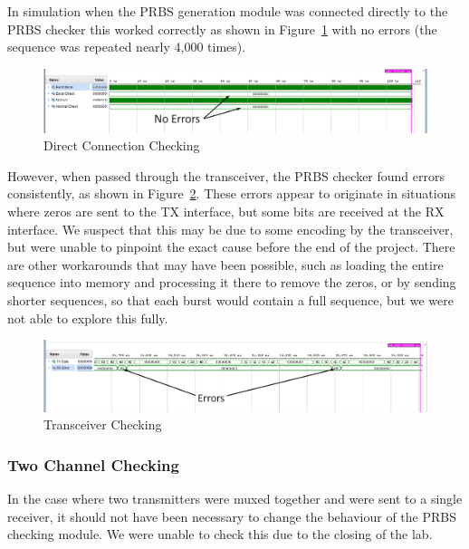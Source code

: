 In simulation when the PRBS generation module was connected directly to the
PRBS checker this worked correctly as shown in Figure~\ref{fig:burst_check_1}
with no errors (the sequence was repeated nearly 4,000 times). 
\begin{figure}[ht]
    \centering
    \hspace*{-3cm}\includegraphics[width=1.5\linewidth]{img/burst_check.png}
    \caption{Direct Connection Checking}%
    \label{fig:burst_check_1}
\end{figure}

However, when passed through the transceiver, the PRBS checker found errors
consistently, as shown in Figure~\ref{fig:burst_check_2}.  These errors appear
to originate in situations where zeros are sent to the TX interface, but some
bits are received at the RX interface.  We suspect that this may be due to some
encoding by the transceiver, but were unable to pinpoint the exact cause before the
end of the project. 
There are other workarounds that may have been possible, such as
loading the entire sequence into memory and processing it there to remove the
zeros, or by sending shorter sequences, so that each burst would contain a full
sequence, but we were not able to explore this fully.

\begin{figure}[ht]
    \centering
    \hspace*{-3cm}\includegraphics[width=1.5\linewidth]{img/burst_check_2.png}
    \caption{Transceiver Checking}%
    \label{fig:burst_check_2}
\end{figure}

\subsubsection{Two Channel Checking}%
\label{ssub:two_channel_checking}
In the case where two transmitters were muxed together and were sent to a
single receiver, it should not have been necessary to change the behaviour of
the PRBS checking module.
We were unable to check this due to the closing of the lab.


